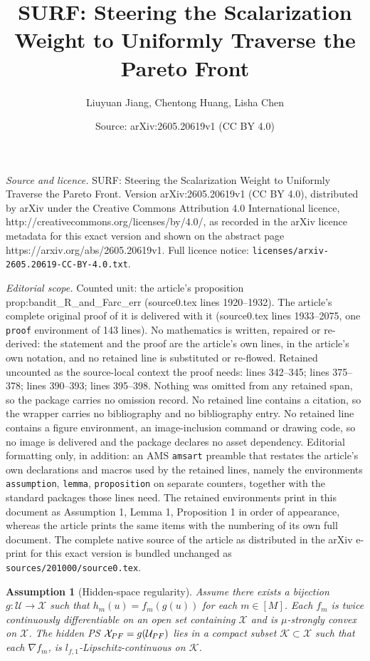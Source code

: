 \documentclass[10pt,a4paper]{amsart}
\title{SURF: Steering the Scalarization Weight to Uniformly Traverse the Pareto Front}
\author{Liuyuan Jiang, Chentong Huang, Lisha Chen}
\date{Source: arXiv:2605.20619v1 (CC BY 4.0)}
\newtheorem{assumption}{Assumption}
\newcommand{\U}{\mathcal{U}}
\newcommand{\X}{\mathcal{X}}
\newcommand{\XPF}{{\mathcal{X}_{\rm PF}}}
\begin{document}
\maketitle

\noindent\emph{Source and licence.} SURF: Steering the Scalarization Weight to Uniformly Traverse the Pareto Front. Version arXiv:2605.20619v1 (CC BY 4.0), distributed by arXiv under the Creative Commons Attribution 4.0 International licence, http://creativecommons.org/licenses/by/4.0/, as recorded in the arXiv licence metadata for this exact version and shown on the abstract page https://arxiv.org/abs/2605.20619v1. Full licence notice: \texttt{licenses/arxiv-2605.20619-CC-BY-4.0.txt}.\par\smallskip

\noindent\textit{Editorial scope.} Counted unit: the article's proposition prop:bandit\_R\_and\_Farc\_err (source0.tex lines 1920--1932). The article's complete original proof of it is delivered with it (source0.tex lines 1933--2075, one \texttt{proof} environment of 143 lines). No mathematics is written, repaired or re-derived: the statement and the proof are the article's own lines, in the article's own notation, and no retained line is substituted or re-flowed.  Retained uncounted as the source-local context the proof needs: lines 342--345; lines 375--378; lines 390--393; lines 395--398.  Nothing was omitted from any retained span, so the package carries no omission record.  No retained line contains a citation, so the wrapper carries no bibliography and no bibliography entry.  No retained line contains a figure environment, an image-inclusion command or drawing code, so no image is delivered and the package declares no asset dependency.  Editorial formatting only, in addition: an AMS \texttt{amsart} preamble that restates the article's own declarations and macros used by the retained lines, namely the environments \texttt{assumption}, \texttt{lemma}, \texttt{proposition} on separate counters, together with the standard packages those lines need.  The retained environments print in this document as Assumption 1, Lemma 1, Proposition 1 in order of appearance, whereas the article prints the same items with the numbering of its own full document.  The complete native source of the article as distributed in the arXiv e-print for this exact version is bundled unchanged as \texttt{sources/201000/source0.tex}.
\begin{assumption}[Hidden-space regularity] 
\label{assump:hidden_regular} 
Assume there exists a bijection $g:\mathcal U\to\mathcal X$ such that $h_m(u)=f_m(g(u))$ for each $m\in[M]$. Each $f_m$ is twice continuously differentiable on an open set containing $\X$ and is $\mu$-strongly convex on $\mathcal X$. The hidden PS $\XPF =g(\U_{\rm PF})$ lies in a compact subset $\mathcal K\subset \mathcal X$ such that each $\nabla f_m$, is $l_{f,1}$-Lipschitz-continuous on $\mathcal K$. 
\end{assumption}
\end{document}
